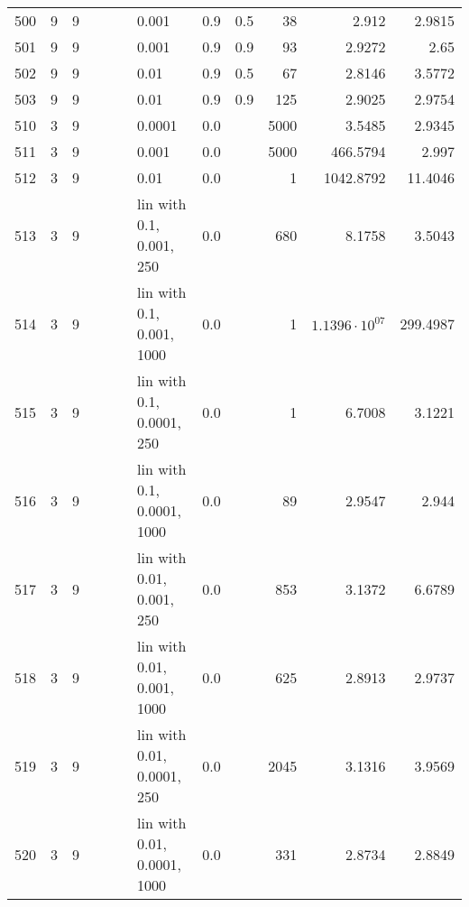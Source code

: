 \begin{longtable}{lrrrrrlrrrrr}
 500 &       9 & 9 &   &   &   &                       0.001 &  0.9 &    0.5 &      38 &                  2.912 &                 2.9815 \\
 501 &       9 & 9 &   &   &   &                       0.001 &  0.9 &    0.9 &      93 &                 2.9272 &                   2.65 \\
 502 &       9 & 9 &   &   &   &                        0.01 &  0.9 &    0.5 &      67 &                 2.8146 &                 3.5772 \\
 503 &       9 & 9 &   &   &   &                        0.01 &  0.9 &    0.9 &     125 &                 2.9025 &                 2.9754 \\
 510 &       3 & 9 &   &   &   &                      0.0001 &  0.0 &        &    5000 &                 3.5485 &                 2.9345 \\
 511 &       3 & 9 &   &   &   &                       0.001 &  0.0 &        &    5000 &               466.5794 &                  2.997 \\
 512 &       3 & 9 &   &   &   &                        0.01 &  0.0 &        &       1 &              1042.8792 &                11.4046 \\
 513 &       3 & 9 &   &   &   &    lin with 0.1, 0.001, 250 &  0.0 &        &     680 &                 8.1758 &                 3.5043 \\
 514 &       3 & 9 &   &   &   &   lin with 0.1, 0.001, 1000 &  0.0 &        &       1 &  $1.1396\cdot 10^{07}$ &               299.4987 \\
 515 &       3 & 9 &   &   &   &   lin with 0.1, 0.0001, 250 &  0.0 &        &       1 &                 6.7008 &                 3.1221 \\
 516 &       3 & 9 &   &   &   &  lin with 0.1, 0.0001, 1000 &  0.0 &        &      89 &                 2.9547 &                  2.944 \\
 517 &       3 & 9 &   &   &   &   lin with 0.01, 0.001, 250 &  0.0 &        &     853 &                 3.1372 &                 6.6789 \\
 518 &       3 & 9 &   &   &   &  lin with 0.01, 0.001, 1000 &  0.0 &        &     625 &                 2.8913 &                 2.9737 \\
 519 &       3 & 9 &   &   &   &  lin with 0.01, 0.0001, 250 &  0.0 &        &    2045 &                 3.1316 &                 3.9569 \\
 520 &       3 & 9 &   &   &   & lin with 0.01, 0.0001, 1000 &  0.0 &        &     331 &                 2.8734 &                 2.8849 \\

\end{longtable}
